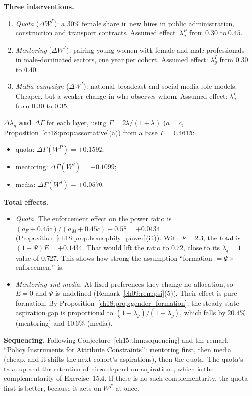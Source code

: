\documentclass[../solutions_manual.tex]{subfiles}
\begin{document}
 \textbf{Three interventions.}
\begin{enumerate}
\item \emph{Quota} ($\Delta W^P$): a 30\% female share in new hires in public administration, construction and transport contracts. Assumed effect: $\lambda_g^P$ from $0.30$ to $0.45$.
\item \emph{Mentoring} ($\Delta W^I$): pairing young women with female and male professionals in male-dominated sectors, one year per cohort. Assumed effect: $\lambda_g^I$ from $0.30$ to $0.40$.
\item \emph{Media campaign} ($\Delta W^I$): national broadcast and social-media role models. Cheaper, but a weaker change in who observes whom. Assumed effect: $\lambda_g^I$ from $0.30$ to $0.35$.
\end{enumerate}

 \textbf{$\Delta\lambda_g$ and $\Delta\Gamma$} for each layer, using $\Gamma = 2\lambda/(1+\lambda)$ ($a = c$, Proposition~\ref{ch18:prop:assortative}(a)) from a base $\Gamma = 0.4615$:
\begin{itemize}
\item quota: $\Delta\Gamma(W^P) = +0.1592$;
\item mentoring: $\Delta\Gamma(W^I) = +0.1099$;
\item media: $\Delta\Gamma(W^I) = +0.0570$.
\end{itemize}

 \textbf{Total effects.}
\begin{itemize}
\item \emph{Quota.} The enforcement effect on the power ratio is $(a_F + 0.45c)/(a_M + 0.45c) - 0.58 = +0.0434$ (Proposition~\ref{ch18:prop:homophily_power}(iii)). With $\Psi = 2.3$, the total is $(1+\Psi)E = +0.1434$. That would lift the ratio to $0.72$, close to its $\lambda_g = 1$ value of $0.727$. This shows how strong the assumption ``formation $= \Psi\times$ enforcement'' is.
\item \emph{Mentoring and media.} At fixed preferences they change no allocation, so $E = 0$ and $\Psi$ is undefined (Remark~\ref{ch09:rem:psi}(5)). Their effect is pure formation. By Proposition~\ref{ch18:prop:gender_formation}, the steady-state aspiration gap is proportional to $(1-\lambda_g)/(1+\lambda_g)$, which falls by $20.4\%$ (mentoring) and $10.6\%$ (media).
\end{itemize}

 \textbf{Sequencing.} Following Conjecture~\ref{ch15:thm:sequencing} and the remark ``Policy Instruments for Attribute Constraints'': mentoring first, then media (cheap, and it shifts the next cohort's aspirations), then the quota. The quota's take-up and the retention of hires depend on aspirations, which is the complementarity of Exercise~15.4. If there is no such complementarity, the quota first is better, because it acts on $W^P$ at once.
\end{document}
